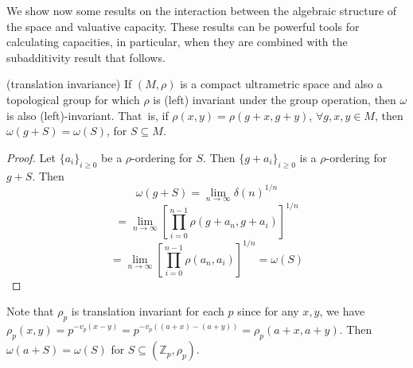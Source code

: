 

We show now some results on the interaction between the algebraic structure of the space and valuative capacity. These results can be powerful tools for calculating capacities, in particular, when they are combined with the subadditivity result that follows.
 
\begin{proposition}
\label{translation invariance}
	(translation invariance) If $(M, \rho)$ is a compact ultrametric space and also a topological group for which $\rho$ is (left) invariant under the group operation, then $\omega$ is also (left)-invariant. That\ is, if $\rho(x,y)=\rho(g+x,g+y)$, $ \forall g,x,y \in M$, then $\omega(g+S)=\omega(S)$, for $S \subseteq M$.	
\end{proposition}

\begin{proof}
	Let $\{a_i\}_{i\geq 0}$ be a $\rho$-ordering for $S$. Then $\{g+a_i\}_{i\geq 0}$ is a $\rho$-ordering for $g+S$. Then \[\omega(g+S) = \lim_{n\to\infty} \delta(n)^{1/n} \]
	\[ = \lim_{n\to\infty} [\prod_{i=0}^{n-1} \rho(g+a_n,g+a_i)]^{1/n} \]
	\[=\lim_{n\to\infty} [\prod_{i=0}^{n-1} \rho(a_n,a_i)]^{1/n}	 = \omega(S) \]
\end{proof}	

\begin{example}
	Note that $\rho_p$ is translation invariant for each $p$ since for any $x,y$, we have $\rho_p(x,y) = p^{-v_p(x-y)} = p^{-v_p((a+x)-(a+y))} = \rho_p(a+x,a+y)$. Then $\omega(a+S) = \omega(S)$ for $S \subseteq (\mathbb{Z}_p, \rho_p)$.
\end{example}

